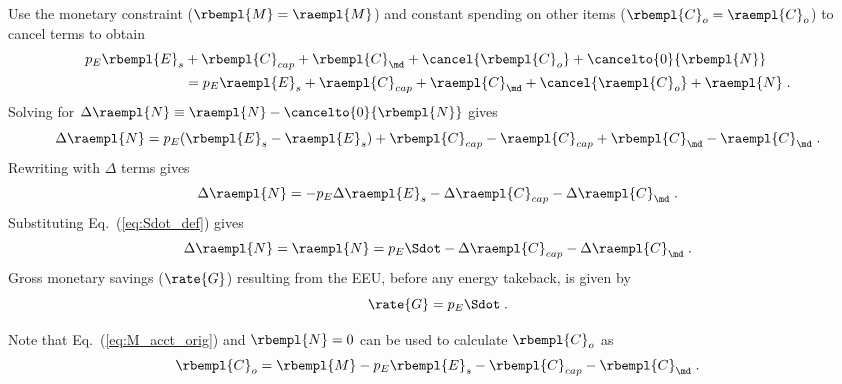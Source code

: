 \begin{landscape}
{Use the monetary constraint ($\rbempl{M} = \raempl{M}$)
and constant spending on other items ($\rbempl{C}_o = \raempl{C}_o$) to cancel terms to obtain
%
\begin{align}
  p_E \rbempl{E}_s &+ \rbempl{C}_{cap} + \rbempl{C}_{\md} + \cancel{\rbempl{C}_o} + \cancelto{0}{\rbempl{N}} \nonumber \\
                   &= p_E \raempl{E}_s + \raempl{C}_{cap} + \raempl{C}_{\md} + \cancel{\raempl{C}_o}  + \raempl{N} \; .
\end{align}
%
Solving for $\Delta \raempl{N} \equiv \raempl{N} - \cancelto{0}{\rbempl{N}}$ gives 
%
\begin{equation}
  \Delta \raempl{N} = p_E(\rbempl{E}_s - \raempl{E}_s) 
                      + \rbempl{C}_{cap} - \raempl{C}_{cap}
                      + \rbempl{C}_{\md} - \raempl{C}_{\md} \; .
\end{equation}
%
Rewriting with $\Delta$ terms gives
%
\begin{equation}
  \Delta \raempl{N} = - p_E \Delta \raempl{E}_s - \Delta \raempl{C}_{cap} - \Delta \raempl{C}_{\md} \; .
\end{equation}
%
Substituting Eq.~(\ref{eq:Sdot_def}) gives
%
\begin{equation} \label{eq:N_dot_star_empl}
  \Delta \raempl{N} = \raempl{N} = p_E \Sdot - \Delta \raempl{C}_{cap} - \Delta \raempl{C}_{\md} \; .
\end{equation}
%
Gross monetary savings ($\rate{G}$) resulting from the EEU, 
before any energy takeback, is given by 
%
\begin{equation} \label{eq:G_dot}
  \rate{G} = p_E \Sdot \; .
\end{equation}

Note that Eq.~(\ref{eq:M_acct_orig}) and $\rbempl{N} = 0$ can be used to calculate $\rbempl{C}_o$ as
%
\begin{equation} \label{eq:C_dot_o}
  \rbempl{C}_o = \rbempl{M} - p_E \rbempl{E}_s - \rbempl{C}_{cap} - \rbempl{C}_{\md} \; .
\end{equation}
%

}
\end{landscape}
